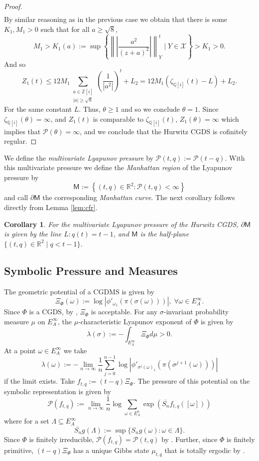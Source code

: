 \documentclass[11pt]{amsart}
\theoremstyle{plain}
\newtheorem{corollary}[theorem]{Corollary}
\theoremstyle{definition}
\renewcommand\~{\tilde}%
\newcommand{\om}{\ensuremath{\omega}}
\newcommand{\cP}{\ensuremath{\mathcal{P}}}
\newcommand{\cX}{\ensuremath{\mathcal{X}}}
\newcommand{\QQ}{\ensuremath{\mathbb Q}}%
\newcommand{\RR}{\ensuremath{\mathbb R}}%
\newcommand{\ZZ}{\ensuremath{\mathbb Z}} %
\numberwithin{equation}{section}
\begin{document}
\begin{proof}
\begin{align*}
    \end{align*}
    By similar reasoning as in the previous case we obtain that there is some $K_1,M_1>0$ such that for all $a\geq \sqrt 8$,
    $$
        M_1> K_1(a) := \sup\left\{\left\|\left\vert\frac{a^2}{(z+a)^2}\right\vert\right\|_Y^t\;\Bigg|\; Y\in \cX \right\} > K_1 >0.
    $$ 
    And so 
    $$
        Z_1(t) \leq 12M_1\sum_{\substack{a\in \ZZ[i]\\ |a|\geq \sqrt{8}}}\left(\frac{1}{|a^2|}\right)^t +L_2 = 12M_1(\zeta_{\QQ[i]}(t)-L)+L_2.
    $$
    For the same constant $L$. Thus, $\theta\geq 1$ and so we conclude $\theta = 1$. Since $\zeta_{\QQ[i]}(\theta) = \infty$, and $Z_1(t)$ is comparable to $\zeta_{\QQ[i]}(t)$, $Z_1(\theta) = \infty$ which implies that $\mathcal P(\theta) = \infty$, and we conclude that the Hurwitz CGDS is cofinitely regular.
\end{proof}

We define the {\it multivariate Lyapunov pressure} by $\cP(t,q):= \cP(t-q)$. With this multivariate pressure we define the {\it Manhattan region} of the Lyapunov pressure by 
$$
    \mathsf{M} := \left\{(t,q)\in \RR^2: \cP(t,q)<\infty\right\}
$$
and call $\partial\mathsf{M}$ the corresponding {\it Manhattan curve}. The next corollary follows directly from Lemma \ref{lem:cfr}.

\begin{corollary}
For the multivariate Lyapunov pressure of the Hurwitz CGDS, $\partial \mathsf{M}$ is given by the line $L:q(t) = t-1$, and $\mathsf{M}$ is the half-plane $\{(t,q)\in \RR^2\;|\;q < t-1\}$. 
\end{corollary}

\subsection{Symbolic Pressure and Measures}


The geometric potential of a CGDMS is given by 
$$
    \Xi_{\Phi}(\om):= \log |\phi'_{\om_1}(\pi(\sigma(\om)))|,\;\forall\om\in E_A^{\infty}.
$$
Since $\Phi$ is a CGDS, by \cite[Lemma 19.4.1]{Urbanski22}, $\Xi_{\Phi}$ is acceptable. 
For any $\sigma$-invariant probability measure $\mu$ on $E_A^{\infty}$, the $\mu$-characteristic Lyapunov exponent of $\Phi$ is given by
$$
    \lambda(\sigma) := -\int_{E_A^{\infty}}\Xi_{\Phi}d\mu > 0.
$$
At a point $\om\in E_A^{\infty}$ we take 
$$
    \lambda(\om):= -\lim_{n\to\infty}\frac{1}{n}\sum_{j=0}^{n-1}\log|\phi'_{\sigma^j(\om)_1}(\pi(\sigma^{j+1}(\om)))|
$$
if the limit exists.
Take $f_{t,q}:= (t-q)\Xi_{\Phi}$. The pressure of this potential on the symbolic representation is given by 
$$
\cP(f_{t,q}) := \lim_{n\to\infty}\frac{1}{n}\log\sum_{\om\in E_A^n}\exp(\overline{S_{n}}f_{t,q}([\omega]))
$$
where for a set $\Lambda\subseteq E_A^{\infty}$
$$
    \overline{S_{n}}g(\Lambda) := \sup\{S_ng(\om):\om\in \Lambda \}.
$$
Since $\Phi$ is finitely irreducible, $\cP(f_{t,q})=\cP(t,q)$ by \cite[Proposition 19.4.6.(a)]{Urbanski22}. Further, since $\Phi$ is finitely primitive, $(t-q)\Xi_{\Phi}$ has a unique Gibbs state $\mu_{t,q}$ that is totally ergodic by \cite[Theorem 17.4.6]{Urbanski22}.
\end{document}
